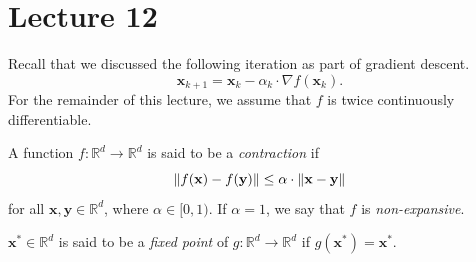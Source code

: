 \section{Lecture 12}

Recall that we discussed the following iteration as part of gradient descent.
\[
    \mathbf{x}_{k+1} = \mathbf{x}_k - \alpha_k \cdot \nabla f(\mathbf{x}_k).
\]
For the remainder of this lecture, we assume that $f$ is twice continuously differentiable. 

\begin{defn}[Contraction]
    A function $f \colon \mathbb{R}^d \to \mathbb{R}^d$ is said to be a \emph{contraction} if 
    \[
        \norm{f(\mathbf{x}) - f(\mathbf{y})} \leq \alpha \cdot \norm{\mathbf{x} - \mathbf{y}}
    \]
    for all $\mathbf{x}, \mathbf{y} \in \mathbb{R}^d$, where $\alpha \in [0,1)$. If $\alpha = 1$, we say that $f$ is \emph{non-expansive}.
\end{defn}

\begin{defn}
    $\mathbf{x}^* \in \mathbb{R}^d$ is said to be a \emph{fixed point} of $g \colon \mathbb{R}^d \to \mathbb{R}^d$ if $g(\mathbf{x}^*) = \mathbf{x}^*$. 
\end{defn}

